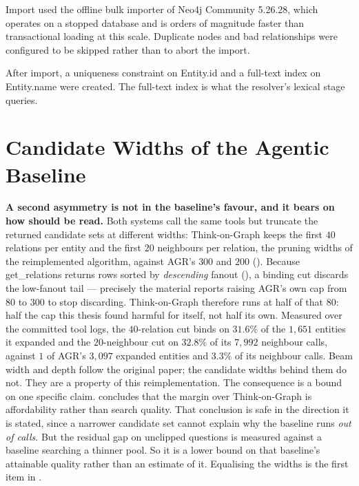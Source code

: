 Import used the offline bulk importer of Neo4j Community 5.26.28, which operates
on a stopped database and is orders of magnitude faster than transactional
loading at this scale. Duplicate nodes and bad relationships were configured to
be skipped rather than to abort the import.

After import, a uniqueness constraint on \textsf{Entity.id} and a full-text
index on \textsf{Entity.name} were created. The full-text index is what the
resolver's lexical stage queries.


\section{Candidate Widths of the Agentic Baseline}\label{app:tog-widths}

\textbf{A second asymmetry is not in the baseline's favour, and it bears on how
 should be read.} Both systems call the same tools but
truncate the returned candidate sets at different widths: Think-on-Graph keeps
the first $40$ relations per entity and the first $20$ neighbours per relation,
the pruning widths of the reimplemented algorithm, against AGR's $300$ and $200$
(). Because \textsf{get\_relations} returns rows sorted by
\emph{descending} fanout (), a binding cut discards the
low-fanout tail --- precisely the material  reports raising
AGR's own cap from $80$ to $300$ to stop discarding. Think-on-Graph therefore
runs at half of that $80$: half the cap this thesis found harmful for itself,
not half its own. Measured over the committed tool logs, the $40$-relation cut
binds on $31.6\%$ of the $1{,}651$ entities it expanded and the $20$-neighbour
cut on $32.8\%$ of its $7{,}992$ neighbour calls, against $1$ of AGR's $3{,}097$
expanded entities and $3.3\%$ of its neighbour calls. Beam width and depth
follow the original paper; the candidate widths behind them do not. They are a
property of this reimplementation. The consequence is a bound on one specific
claim.  concludes that the margin over Think-on-Graph is
affordability rather than search quality. That conclusion is safe in the
direction it is stated, since a narrower candidate set cannot explain why the
baseline runs \emph{out of calls}. But the residual gap on unclipped questions
is measured against a baseline searching a thinner pool. So it is a lower bound
on that baseline's attainable quality rather than an estimate of it. Equalising
the widths is the first item in .



